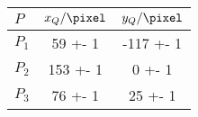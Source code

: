 \begin{tabular}{lSS}
\toprule

{$P$} & {$x_Q / \si{\pixel}$} & {$y_Q / \si{\pixel}$} \\

\midrule

$P_1$ & 59 +- 1 & -117 +- 1 \\
$P_2$ & 153 +- 1 & 0 +- 1 \\
$P_3$ & 76 +- 1 & 25 +- 1 \\

\bottomrule
\end{tabular}